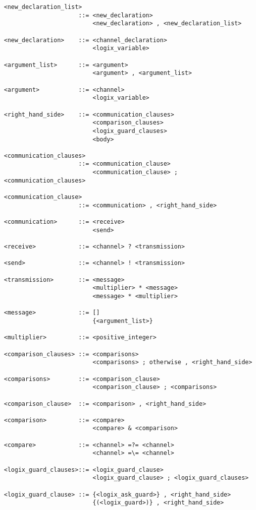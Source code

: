 \begin{verbatim}
<new_declaration_list>
                     ::= <new_declaration>
                         <new_declaration> , <new_declaration_list>

<new_declaration>    ::= <channel_declaration>
                         <logix_variable>

<argument_list>      ::= <argument>
                         <argument> , <argument_list>

<argument>           ::= <channel>
                         <logix_variable>

<right_hand_side>    ::= <communication_clauses>
                         <comparison_clauses>
                         <logix_guard_clauses>
                         <body>

<communication_clauses>
                     ::= <communication_clause> 
                         <communication_clause> ; <communication_clauses>

<communication_clause>
                     ::= <communication> , <right_hand_side>

<communication>      ::= <receive>
                         <send>

<receive>            ::= <channel> ? <transmission>

<send>               ::= <channel> ! <transmission>

<transmission>       ::= <message>
                         <multiplier> * <message>
                         <message> * <multiplier>

<message>            ::= []
                         {<argument_list>}

<multiplier>         ::= <positive_integer>

<comparison_clauses> ::= <comparisons>
                         <comparisons> ; otherwise , <right_hand_side>

<comparisons>        ::= <comparison_clause>
                         <comparison_clause> ; <comparisons>

<comparison_clause>  ::= <comparison> , <right_hand_side>

<comparison>         ::= <compare>
                         <compare> & <comparison>

<compare>            ::= <channel> =?= <channel>
                         <channel> =\= <channel>

<logix_guard_clauses>::= <logix_guard_clause> 
                         <logix_guard_clause> ; <logix_guard_clauses>

<logix_guard_clause> ::= {<logix_ask_guard>} , <right_hand_side>
                         {(<logix_guard>)} , <right_hand_side>


\end{verbatim}
